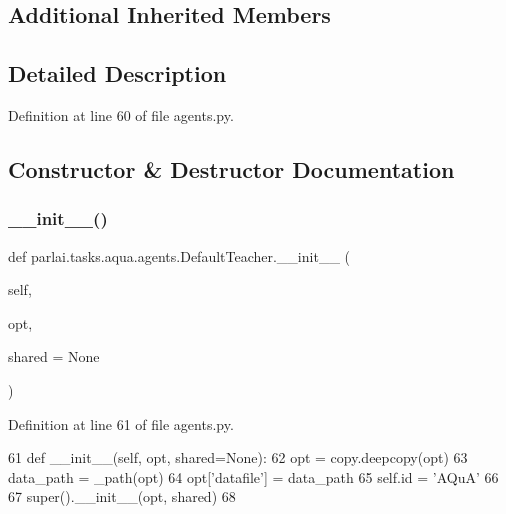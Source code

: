 \subsection*{Additional Inherited Members}


\subsection{Detailed Description}


Definition at line 60 of file agents.\+py.



\subsection{Constructor \& Destructor Documentation}
\mbox{\label{classparlai_1_1tasks_1_1aqua_1_1agents_1_1DefaultTeacher_a38b4f35f89a9c859e70ed88f1520e5bf}} 
\subsubsection{\texorpdfstring{\+\_\+\+\_\+init\+\_\+\+\_\+()}{\_\_init\_\_()}}
{\footnotesize\ttfamily def parlai.\+tasks.\+aqua.\+agents.\+Default\+Teacher.\+\_\+\+\_\+init\+\_\+\+\_\+ (\begin{DoxyParamCaption}\item[{}]{self,  }\item[{}]{opt,  }\item[{}]{shared = {\ttfamily None} }\end{DoxyParamCaption})}



Definition at line 61 of file agents.\+py.


\begin{DoxyCode}
61     \textcolor{keyword}{def }\_\_init\_\_(self, opt, shared=None):
62         opt = copy.deepcopy(opt)
63         data\_path = \_path(opt)
64         opt[\textcolor{stringliteral}{'datafile'}] = data\_path
65         self.id = \textcolor{stringliteral}{'AQuA'}
66 
67         super().\_\_init\_\_(opt, shared)
68 
\end{DoxyCode}


